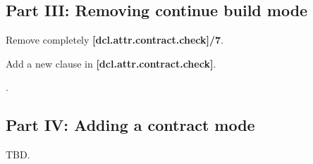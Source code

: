 \subsection{Part III: Removing continue build mode}

Remove completely \textbf{[dcl.attr.contract.check]/7}.

Add a new clause in \textbf{[dcl.attr.contract.check]}.

\begin{flushright}
\begin{minipage}[t]{0.9\textwidth}
.
\end{minipage}
\end{flushright}

\subsection{Part IV: Adding a contract mode}

TBD.
